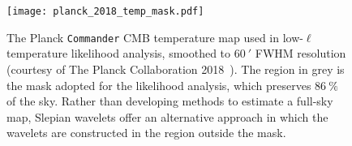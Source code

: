 \begin{figure}[htpb]
	\centering\capstart{}
	\texttt{[image: planck\_2018\_temp\_mask.pdf]}
	\caption[
		The 2018 Planck CMB map with the \texttt{Commander} mask
	]{
		The Planck \texttt{Commander} CMB temperature map used in low-\(\ell{}\) temperature likelihood analysis, smoothed to \(\SI{60}{\arcminute}\) FWHM resolution (courtesy of The Planck Collaboration 2018~\cite{Planck2020a}).
		The region in grey is the mask adopted for the likelihood analysis, which preserves \(\SI{86}{\percent}\) of the sky.
		Rather than developing methods to estimate a full-sky map, Slepian wavelets offer an alternative approach in which the wavelets are constructed in the region outside the mask.
	}\label{fig:chapter2_planck_masked}
\end{figure}
